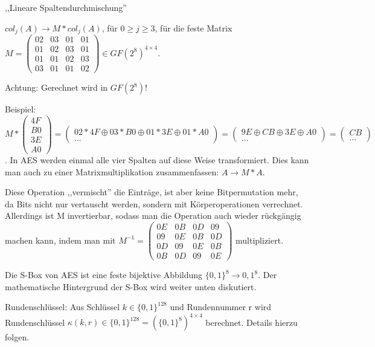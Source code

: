 \documentclass[a4paper]{article}
\begin{document}
\begin{multicols}{3}
\begin{itemize*}
        \item ,,Lineare Spaltendurchmischung''
        \item $col_j(A) \rightarrow M*col_j(A)$, für $0\geq j\geq 3$, für die feste Matrix $M=\begin{pmatrix} 02& 03& 01& 01\\ 01& 02& 03& 01\\ 01& 01& 02& 03\\ 03& 01& 01& 02\end{pmatrix}\in GF(2^8)^{4\times 4}$.
    \end{itemize*}

    Achtung: Gerechnet wird in $GF(2^8)$!

    Beispiel: $M*\begin{pmatrix} 4F\\ B0\\ 3E\\ A0\end{pmatrix} = \begin{pmatrix} 02*4F\oplus 03*B0\oplus 01*3E\oplus 01*A0\\ ... \end{pmatrix} = \begin{pmatrix} 9E\oplus CB\oplus 3E\oplus A0 \\ ... \end{pmatrix} = \begin{pmatrix} CB\\...\end{pmatrix}$.
    In AES werden einmal alle vier Spalten auf diese Weise transformiert. Dies kann man auch zu einer Matrixmultiplikation zusammenfassen: $A \rightarrow M*A$.

    Diese Operation ,,vermischt'' die Einträge, ist aber keine Bitpermutation mehr, da Bits nicht nur vertauscht werden, sondern mit Körperoperationen verrechnet. Allerdings ist M invertierbar, sodass man die Operation auch wieder rückgängig machen kann, indem man mit $M^{-1}=\begin{pmatrix} 0E& 0B& 0D& 09\\ 09& 0E& 0B& 0D\\ 0D& 09& 0E& 0B\\ 0B& 0D& 09& 0E\end{pmatrix}$ multipliziert.
    \begin{itemize*}
        \item Die S-Box von AES ist eine feste bijektive Abbildung $\{0,1\}^8\rightarrow {0,1}^8$. Der mathematische Hintergrund der S-Box wird weiter unten diskutiert.
        \item Rundenschlüssel: Aus Schlüssel $k\in\{0,1\}^{128}$ und Rundennummer r wird Rundenschlüssel $\kappa (k,r)\in\{0,1\}^{128}=(\{0,1\}^8)^{4\times 4}$ berechnet. Details hierzu folgen.
    \end{itemize*}


\end{multicols}
\end{document}
